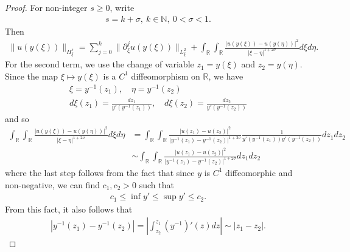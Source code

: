 \documentclass[12pt,reqno]{amsart}
\numberwithin{equation}{section}  %
\numberwithin{figure}{section}
\newcommand{\rr}{\mathbb{R}}
\newcommand{\p}{\partial}
\begin{document}
\begin{proof}
For non-integer $s \ge 0$, write
%
%
\begin{equation*}
\begin{split}
  s = k + \sigma, \ k \in \mathbb{N}, \ 0 < \sigma < 1. 
\end{split}
\end{equation*}
%
%
Then 
%
%
\begin{equation*}
\begin{split}
  \| u(y(\xi)) \|_{H^{s}_{\xi}} = \sum_{j = 0}^{k} \| \p_{\xi}^{j} u (y(\xi))
  \|_{L^{2}_{\xi}} + \int_{\rr} \int_{\rr} \frac{| u(y(\xi)) - u(y(\eta))
    |^{2}}{| \xi - \eta |^{1 + 2 \sigma}} d \xi d \eta.
\end{split}
\end{equation*}
%
%
For the second term, we use the change of variable $z_{1} = y(\xi)$ and $z_{2} = y(\eta)$. Since the map $\xi \mapsto y(\xi)$ is a $C^{1}$ diffeomorphism on $\rr$, we have
%
%
\begin{gather*}
   \xi= y^{-1}(z_{1}), \quad \eta = y^{-1}(z_{2})
  \\
   d \xi(z_{1}) = \frac{dz_{1}}{y'(y^{-1}(z_{1}))}, \quad d \xi(z_{2}) = \frac{dz_{2}}{y'(y^{-1}(z_{2}))}
\end{gather*}
%
%
and so
%
%
\begin{equation}
  \label{hg}
\begin{split}
\int_{\rr} \int_{\rr} \frac{| u(y(\xi)) - u(y(\eta))
    |^{2}}{| \xi - \eta |^{1 + 2 \sigma}} d \xi d \eta & = \int_{\rr} \int_{\rr}
    \frac{| u(z_{1}) - u(z_{2}) |^{2}}{| y^{-1}(z_{1}) - y^{-1}(z_{2}) |^{1 + 2
    \sigma}} \frac{1}{y'(y^{-1}(z_{1})) y'(y^{-1}(z_{2}))} d z_{1} d z_{2}
    \\
    & \sim \int_{\rr} \int_{\rr} \frac{| u(z_{1}) - u(z_{2}) |^{2}}{|
      y^{-1}(z_{1}) - y^{-1}(z_{2}) |^{1 + 2 \sigma}} d z_{1} dz_{2}
\end{split}
\end{equation}
%
%
where the last step follows from the fact that since $y$ is $C^{1}$
diffeomorphic  and non-negative, we can find $c_{1}, c_{2} > 0$ such that
%
%
\begin{equation*}
\begin{split}
  c_{1} \le \inf y' \le \sup y' \le c_{2}.
\end{split}
\end{equation*}
%
%
From this fact, it also follows that
%
%
\begin{equation*}
\begin{split}
  | y^{-1}(z_{1}) - y^{-1}(z_{2}) | = | \int_{z_{2}}^{z_{1}} (y^{-1})'(z) dz | \sim | z_{1} - z_{2} |.

\end{split}
\end{equation*}
\end{proof}
\end{document}
